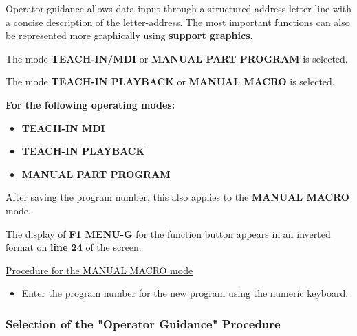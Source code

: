 Operator guidance allows data input through a structured address-letter line with a concise description of the letter-address. The most important functions can also be represented more graphically using \textbf{support graphics}.

\procedure

\begin{itemize}
    \vspace{.6cm}
\end{itemize}

\vspace{.5cm}

The mode \textbf{TEACH-IN/MDI} or \textbf{MANUAL PART PROGRAM} is selected.

\begin{itemize}
\end{itemize}

The mode \textbf{TEACH-IN PLAYBACK} or \textbf{MANUAL MACRO} is selected.

\textbf{For the following operating modes:}

\begin{itemize}
    \item \textbf{TEACH-IN MDI}
    \item \textbf{TEACH-IN PLAYBACK}
    \item \textbf{MANUAL PART PROGRAM}
\end{itemize}

After saving the program number, this also applies to the \textbf{MANUAL MACRO} mode.

The display of \textbf{F1 MENU-G} for the function button appears in an inverted format on \textbf{line 24} of the screen.

\underline{Procedure for the MANUAL MACRO mode}

\begin{itemize}
    \item Enter the program number for the new program using the numeric keyboard.
\end{itemize}

\subsubsection*{Selection of the "Operator Guidance" Procedure}

